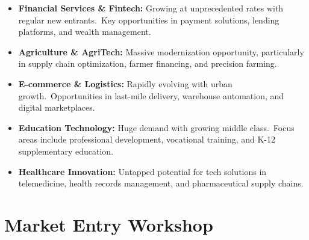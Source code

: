 \begin{tcolorbox}[colback=white,colframe=primary,title=\textbf{Growth Sectors}]
\begin{itemize}
    \item \textbf{Financial Services \& Fintech:}
    Growing at unprecedented rates with regular new entrants.\ Key opportunities in payment solutions, lending platforms, and wealth management.

    \item \textbf{Agriculture \& AgriTech:}
    Massive modernization opportunity, particularly in supply chain optimization, farmer financing, and precision farming.

    \item \textbf{E-commerce \& Logistics:}
    Rapidly evolving with urban growth.\ Opportunities in last-mile delivery, warehouse automation, and digital marketplaces.

    \item \textbf{Education Technology:}
    Huge demand with growing middle class.\ Focus areas include professional development, vocational training, and K-12 supplementary education.

    \item \textbf{Healthcare Innovation:}
    Untapped potential for tech solutions in telemedicine, health records management, and pharmaceutical supply chains.
\end{itemize}
\end{tcolorbox}

\section{Market Entry Workshop}\label{sec:market-entry-workshop}

